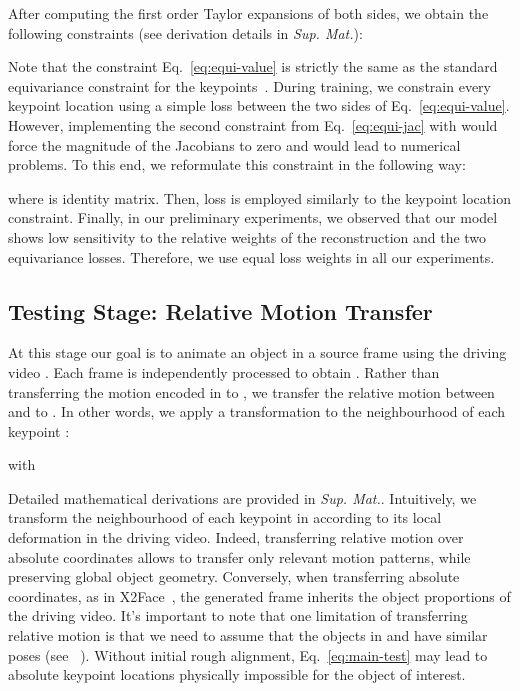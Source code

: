 \documentclass{article}
\begin{document}
After computing the first order Taylor expansions of both sides, we obtain the following constraints (see derivation details in \textit{Sup. Mat.}):


Note that the constraint Eq.~\eqref{eq:equi-value} is strictly the same as the standard equivariance constraint for the keypoints~\cite{jakabunsupervised,Zhang_2018_CVPR}. During training, we constrain every keypoint location using a simple  loss between the two sides of Eq.~\eqref{eq:equi-value}. However, implementing the second constraint from Eq.~\eqref{eq:equi-jac} with  would force the magnitude of the Jacobians to zero and would lead to numerical problems. To this end, we reformulate this constraint in the following way:

where  is  identity matrix. Then,  loss is employed similarly to the keypoint location constraint. Finally, in our preliminary experiments, we observed that our model shows low sensitivity to the relative weights of the reconstruction and the two equivariance losses. Therefore, we use equal loss weights in all our experiments.



\subsection{Testing Stage: Relative Motion Transfer}
\label{sec:test}
  At this stage our goal is to animate an object in a source frame  using the driving video . Each frame  is independently processed to obtain . Rather than transferring the motion encoded in  to , we transfer the relative motion between  and  to . In other words, we apply a transformation  to the neighbourhood of each keypoint : 

with

Detailed mathematical derivations are provided in \textit{Sup. Mat.}. Intuitively, we transform the neighbourhood of each keypoint  in  according to its local deformation in the driving video. Indeed, transferring relative motion over absolute coordinates allows to transfer only relevant motion patterns, while preserving global object geometry. Conversely, when transferring absolute coordinates, as in X2Face~\cite{wiles2018x2face}, the generated frame inherits the object proportions of the driving video. It's important to note that one limitation of transferring relative motion is that we need to assume that the objects in  and  have similar poses (see ~\cite{siarohin2018animating}). Without initial rough alignment, Eq.~\eqref{eq:main-test} may lead to absolute keypoint locations physically impossible for the object of interest.
\end{document}
